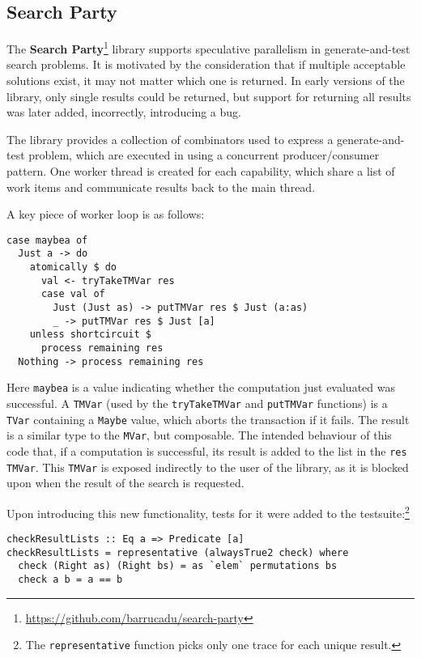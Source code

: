 \subsection{Search Party}

The \textbf{Search Party}\footnote{\url{https://github.com/barrucadu/search-party}}
library supports speculative parallelism in generate-and-test search
problems.  It is motivated by the consideration that if multiple
acceptable solutions exist, it may not matter which one is returned.
In early versions of the library, only single results could be
returned, but support for returning all results was later added,
incorrectly, introducing a bug.

The library provides a collection of combinators used to express a
generate-and-test problem, which are executed in using a concurrent
producer/consumer pattern.  One worker thread is created for each
capability, which share a list of work items and communicate results
back to the main thread.

A key piece of worker loop is as follows:

\begin{verbatim}
case maybea of
  Just a -> do
    atomically $ do
      val <- tryTakeTMVar res
      case val of
        Just (Just as) -> putTMVar res $ Just (a:as)
        _ -> putTMVar res $ Just [a]
    unless shortcircuit $
      process remaining res
  Nothing -> process remaining res
\end{verbatim}

Here \verb|maybea| is a value indicating whether the computation just
evaluated was successful.  A \verb|TMVar| (used by the
\verb|tryTakeTMVar| and \verb|putTMVar| functions) is a \verb|TVar|
containing a \verb|Maybe| value, which aborts the transaction if it
fails.  The result is a similar type to the \verb|MVar|, but
composable.  The intended behaviour of this code that, if a
computation is successful, its result is added to the list in the
\verb|res| \verb|TMVar|.  This \verb|TMVar| is exposed indirectly to
the user of the library, as it is blocked upon when the result of the
search is requested.

Upon introducing this new functionality, tests for it were added to
the testsuite:\footnote{The \texttt{representative} function picks
  only one trace for each unique result.}

\begin{verbatim}
checkResultLists :: Eq a => Predicate [a]
checkResultLists = representative (alwaysTrue2 check) where
  check (Right as) (Right bs) = as `elem` permutations bs
  check a b = a == b
\end{verbatim}

